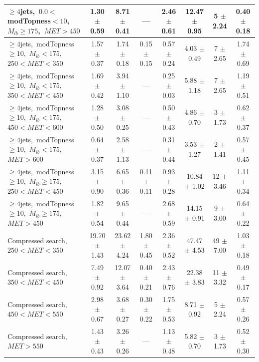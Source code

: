 \begin{table}
\begin{tabular}{|l|c c c c c|c|c|}
$\ge4$jets,~$0.0<$modTopness$<10$,~$M_{lb}\ge175$,~$MET>450$  & 1.30 $\pm$ 0.59  & 8.71 $\pm$ 0.41  & ---  & 2.46 $\pm$ 0.61  & 12.47 $\pm$ 0.95  & 5 $\pm$ 2.24  & 0.40 $\pm$ 0.18 \\*
\hline
$\ge4$jets,~modTopness$\ge10$,~$M_{lb}<175$,~$250<MET<350$  & 1.57 $\pm$ 0.37  & 1.74 $\pm$ 0.18  & 0.15 $\pm$ 0.15  & 0.57 $\pm$ 0.24  & 4.03 $\pm$ 0.49  & 7 $\pm$ 2.65  & 1.74 $\pm$ 0.69 \\*
$\ge4$jets,~modTopness$\ge10$,~$M_{lb}<175$,~$350<MET<450$  & 1.69 $\pm$ 0.42  & 3.94 $\pm$ 1.10  & ---  & 0.25 $\pm$ 0.03  & 5.88 $\pm$ 1.18  & 7 $\pm$ 2.65  & 1.19 $\pm$ 0.51 \\*
$\ge4$jets,~modTopness$\ge10$,~$M_{lb}<175$,~$450<MET<600$  & 1.28 $\pm$ 0.50  & 3.08 $\pm$ 0.25  & ---  & 0.50 $\pm$ 0.43  & 4.86 $\pm$ 0.70  & 3 $\pm$ 1.73  & 0.62 $\pm$ 0.37 \\*
$\ge4$jets,~modTopness$\ge10$,~$M_{lb}<175$,~$MET>600$  & 0.64 $\pm$ 0.37  & 2.58 $\pm$ 1.13  & ---  & 0.31 $\pm$ 0.44  & 3.53 $\pm$ 1.27  & 2 $\pm$ 1.41  & 0.57 $\pm$ 0.45 \\*
\hline
$\ge4$jets,~modTopness$\ge10$,~$M_{lb}\ge175$,~$250<MET<450$  & 3.15 $\pm$ 0.90  & 6.65 $\pm$ 0.36  & 0.11 $\pm$ 0.11  & 0.93 $\pm$ 0.28  & 10.84 $\pm$ 1.02  & 12 $\pm$ 3.46  & 1.11 $\pm$ 0.34 \\*
$\ge4$jets,~modTopness$\ge10$,~$M_{lb}\ge175$,~$MET>450$  & 1.82 $\pm$ 0.54  & 9.65 $\pm$ 0.44  & ---  & 2.68 $\pm$ 0.59  & 14.15 $\pm$ 0.91  & 9 $\pm$ 3.00  & 0.64 $\pm$ 0.22 \\*
\hline
Compressed search, $250<MET<350$  & 19.70 $\pm$ 1.43  & 23.62 $\pm$ 4.24  & 1.80 $\pm$ 0.45  & 2.36 $\pm$ 0.52  & 47.47 $\pm$ 4.53  & 49 $\pm$ 7.00  & 1.03 $\pm$ 0.18 \\*
Compressed search, $350<MET<450$  & 7.49 $\pm$ 0.92  & 12.07 $\pm$ 3.64  & 0.40 $\pm$ 0.21  & 2.43 $\pm$ 0.76  & 22.38 $\pm$ 3.83  & 11 $\pm$ 3.32  & 0.49 $\pm$ 0.17 \\*
Compressed search, $450<MET<550$  & 2.98 $\pm$ 0.67  & 3.68 $\pm$ 0.27  & 0.30 $\pm$ 0.22  & 1.75 $\pm$ 0.53  & 8.71 $\pm$ 0.92  & 5 $\pm$ 2.24  & 0.57 $\pm$ 0.26 \\*
Compressed search, $MET>550$  & 1.43 $\pm$ 0.43  & 3.26 $\pm$ 0.26  & ---  & 1.13 $\pm$ 0.48  & 5.82 $\pm$ 0.70  & 3 $\pm$ 1.73  & 0.52 $\pm$ 0.30 \\*
\hline
\end{tabular}
\end{table}

